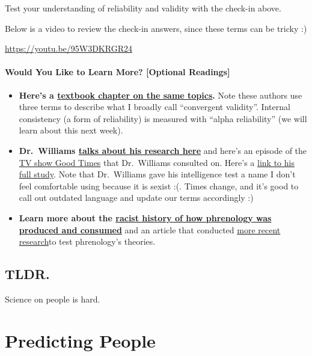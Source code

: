 \documentclass[
  letterpaper,
  DIV=11,
  numbers=noendperiod,
  oneside]{scrreprt}
\begin{document}
Test your understanding of reliability and validity with the check-in
above.

Below is a video to review the check-in answers, since these terms can
be tricky :)

\url{https://youtu.be/95W3DKRGR24}

\subsection{Would You Like to Learn More? {[}Optional
Readings{]}}\label{would-you-like-to-learn-more-optional-readings}

\begin{itemize}
\item
  \textbf{Here's a
  \href{https://kpu.pressbooks.pub/psychmethods4e/chapter/reliability-and-validity-of-measurement/}{textbook
  chapter on the same topics}.} Note these authors use three terms to
  describe what I broadly call ``convergent validity''. Internal
  consistency (a form of reliability) is measured with ``alpha
  reliability'' (we will learn about this next week).
\item
  \textbf{Dr.~Williams
  \href{https://www.youtube.com/watch?v=SAqHmKIXZBE}{talks about his
  research here}} and here's an episode of the
  \href{http://dailymotion.com/video/x6fmo36}{TV show Good Times} that
  Dr.~Williams consulted on. Here's a
  \href{https://files.eric.ed.gov/fulltext/ED070799.pdf}{link to his
  full study}. Note that Dr.~Williams gave his intelligence test a name
  I don't feel comfortable using because it is sexist :(. Times change,
  and it's good to call out outdated language and update our terms
  accordingly :)
\item
  \textbf{Learn more about the
  \href{https://www.theguardian.com/science/blog/2013/feb/05/django-unchained-racist-science-phrenology}{racist
  history of how phrenology was produced and consumed}} and an article
  that conducted
  \href{http://theconversation.com/neuroscientists-put-the-dubious-theory-of-phrenology-through-rigorous-testing-for-the-first-time-88291}{more
  recent research}to test phrenology's theories.
\end{itemize}

\chapter{TLDR.}\label{tldr.-1}

Science on people is hard.

\part{Predicting People}
\end{document}
